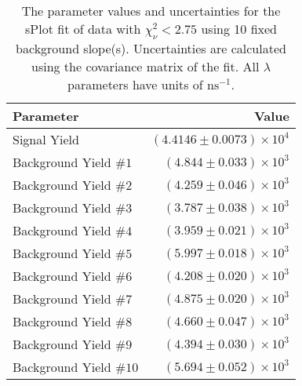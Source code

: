 
\begin{table}
    \begin{center}
        \begin{tabular}{lr}\toprule
            Parameter & Value \\\midrule
            Signal Yield & $(4.4146 \pm 0.0073) \times 10^{4}$ \\
            Background Yield $\#1$ & $(4.844 \pm 0.033) \times 10^{3}$ \\
            Background Yield $\#2$ & $(4.259 \pm 0.046) \times 10^{3}$ \\
            Background Yield $\#3$ & $(3.787 \pm 0.038) \times 10^{3}$ \\
            Background Yield $\#4$ & $(3.959 \pm 0.021) \times 10^{3}$ \\
            Background Yield $\#5$ & $(5.997 \pm 0.018) \times 10^{3}$ \\
            Background Yield $\#6$ & $(4.208 \pm 0.020) \times 10^{3}$ \\
            Background Yield $\#7$ & $(4.875 \pm 0.020) \times 10^{3}$ \\
            Background Yield $\#8$ & $(4.660 \pm 0.047) \times 10^{3}$ \\
            Background Yield $\#9$ & $(4.394 \pm 0.030) \times 10^{3}$ \\
            Background Yield $\#10$ & $(5.694 \pm 0.052) \times 10^{3}$ \\\bottomrule
        \end{tabular}
        \caption{The parameter values and uncertainties for the sPlot fit of data with $\chi^2_\nu < 2.75$ using 10 fixed background slope(s). Uncertainties are calculated using the covariance matrix of the fit. All $\lambda$ parameters have units of $\si{\nano\second}^{-1}$.}
    \end{center}
\end{table}
